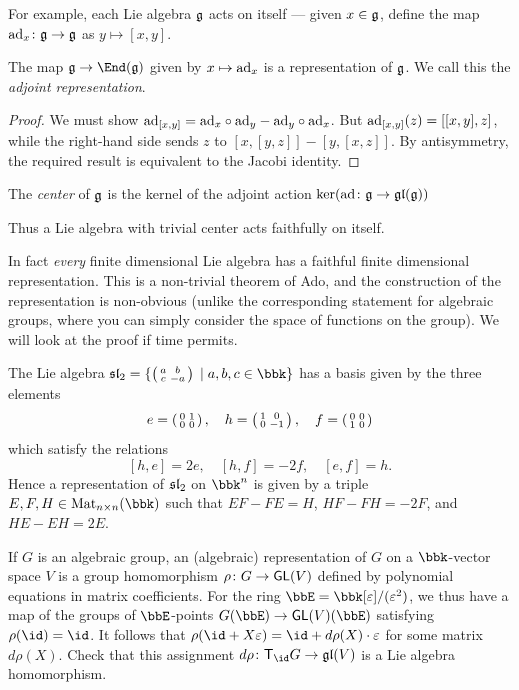 For example, each Lie algebra $\frakg$ acts on itself --- given $x\in \frakg$, define
the map $\adj_x\colon \frakg \to \frakg$ as $y\mapsto [x,y]$.

\begin{lemma}
    The map $\frakg \to \End(\frakg)$ given by $x\mapsto \adj_x$ is a representation of
    $\frakg$. We call this the \emph{adjoint representation}.
    \begin{proof}
        We must show $\adj_{[x,y]} = \adj_x\circ \adj_y - \adj_y\circ \adj_x$.
        But $\adj_{[x,y]}(z)=[[x,y],z]$, while the right-hand side sends $z$ to
        $[x,[y,z]]-[y,[x,z]]$. By antisymmetry, the required result is
        equivalent to the Jacobi identity.
    \end{proof}
\end{lemma}

\begin{definition}
    The \emph{center} of $\frakg$ is the kernel of the adjoint action
    $\ker(\adj\colon \frakg\to \gl(\frakg))$
\end{definition}

Thus a Lie algebra with trivial center acts faithfully on itself. 

\begin{remark}
In fact \emph{every} finite dimensional Lie algebra has a faithful finite
dimensional representation. This is a non-trivial theorem of Ado, and the
construction of the representation is non-obvious (unlike the
corresponding statement for algebraic groups, where you can simply consider the
space of functions on the group). We will look at the proof if time permits.
\end{remark}

\begin{example}
The Lie algebra $\sl_2=\{\mat{a & b \\ c & -a}\;|\; a,b,c\in \bbk\}$ has a basis given
by the three elements \[e=\mat{0&1\\0&0}, \quad h = \mat{1 & 0 \\ 0 & -1}, \quad f
= \mat{0 & 0 \\ 1 & 0}\]
which satisfy the relations 
\[[h,e]=2e, \quad [h,f]=-2f, \quad [e,f]=h.\]
Hence a representation of $\sl_2$ on $\bbk^n$ is given by a triple $E,F,H\in
\Mat{n}(\bbk)$ such that $EF-FE=H$, $HF-FH=-2F$, and $HE-EH=2E$.
\end{example}

\begin{exercise}
    If $G$ is an algebraic group, an (algebraic) representation of $G$ on a
    $\bbk$-vector space $V$ is a group homomorphism $\rho\colon G\to
    \sf{GL}(V)$ defined by polynomial equations in matrix coefficients. For the
    ring $\bbE=\bbk[\varepsilon]/(\varepsilon^2)$, we thus have a map of the
    groups of $\bbE$-points $G(\bbE)\to \sf{GL}(V)(\bbE)$ satisfying
    $\rho(\id)=\id$. It follows that $\rho(\id + X\varepsilon) = \id  +
    d\rho(X)\cdot \varepsilon$ for some matrix $d\rho(X)$. Check that this
    assignment $d\rho\colon \sf{T}_\id G \to \gl(V)$ is a Lie algebra
    homomorphism.
\end{exercise}

